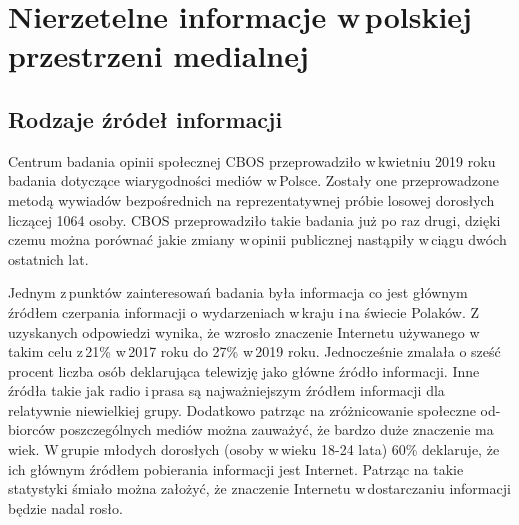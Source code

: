 
\newpage
\section{Nierzetelne informacje w\,polskiej przestrzeni medialnej}
\subsection{Rodzaje źródeł informacji}
Centrum badania opinii społecznej CBOS przeprowadziło w\,kwietniu 2019 roku badania dotyczące wiarygodności mediów w\,Polsce. Zostały one przeprowadzone metodą wywiadów bezpośrednich na reprezentatywnej próbie losowej dorosłych liczącej 1064 osoby. CBOS przeprowadziło takie badania już po raz drugi, dzięki czemu można porównać jakie zmiany w\,opinii publicznej nastąpiły w\,ciągu dwóch ostatnich lat\cite{CBOSWiarygodnoscMediow2019}.
\par 
Jednym z\,punktów zainteresowań badania była informacja co jest głównym źródłem czerpania informacji o wydarzeniach w\,kraju i\,na świecie Polaków.  Z\,uzyskanych odpowiedzi wynika, że wzrosło znaczenie Internetu używanego w\,takim celu z\,21\% w\,2017 roku do 27\% w\,2019 roku. Jednocześnie zmalała o sześć procent liczba osób deklarująca telewizję jako główne źródło informacji. Inne źródła takie jak radio i\,prasa są najważniejszym źródłem informacji dla relatywnie niewielkiej grupy. Dodatkowo patrząc na zróżnicowanie społeczne od-biorców poszczególnych mediów można zauważyć, że bardzo duże znaczenie ma wiek. W\,grupie młodych dorosłych (osoby w\,wieku 18-24 lata) 60\% deklaruje, że ich głównym źródłem pobierania informacji jest Internet. Patrząc na takie statystyki śmiało można założyć, że znaczenie Internetu w\,dostarczaniu informacji będzie nadal rosło.
